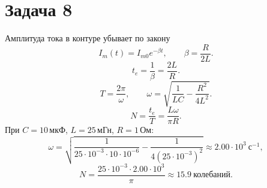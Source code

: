 \documentclass[a4paper,12pt]{article}
\begin{document}
\section*{Задача 8}

Амплитуда тока в контуре убывает по закону
\[
    I_m(t)=I_{m0}e^{-\beta t},
    \qquad
    \beta=\frac{R}{2L}.
\]
\[
    t_e=\frac{1}{\beta}=\frac{2L}{R}.
\]
\[
    T=\frac{2\pi}{\omega},
    \qquad
    \omega=\sqrt{\frac{1}{LC}-\frac{R^2}{4L^2}}.
\]
\[
    N=\frac{t_e}{T}=\frac{L\omega}{\pi R}.
\]
При \(C=10\,\text{мкФ}\), \(L=25\,\text{мГн}\), \(R=1\,\text{Ом}\):
\[
    \omega=\sqrt{\frac{1}{25\cdot10^{-3}\cdot10\cdot10^{-6}}
    -\frac{1}{4(25\cdot10^{-3})^2}}
    \approx 2.00\cdot10^3\ \text{с}^{-1},
\]
\[
    N=\frac{25\cdot10^{-3}\cdot2.00\cdot10^3}{\pi}
    \approx 15.9\ \text{колебаний}.
\]
\end{document}
